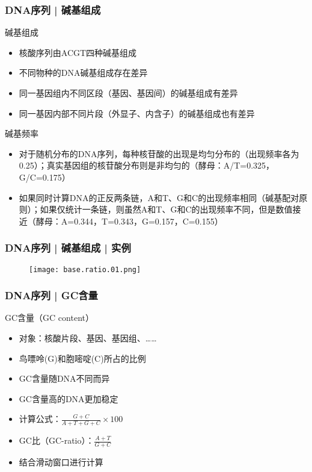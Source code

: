 \begin{frame}
  \frametitle{DNA序列 | 碱基组成}
  \begin{block}{碱基组成}
  \begin{itemize}
    \item 核酸序列由ACGT四种碱基组成
    \item 不同物种的DNA碱基组成存在差异
    \item 同一基因组内不同区段（基因、基因间）的碱基组成有差异
    \item 同一基因内部不同片段（外显子、内含子）的碱基组成也有差异
  \end{itemize}
  \end{block}
  \vspace{-0.3em}
  \pause
  \begin{block}{碱基频率}
  \begin{itemize}
    \item 对于随机分布的DNA序列，每种核苷酸的出现是均匀分布的（出现频率各为0.25）；真实基因组的核苷酸分布则是非均匀的（酵母：A/T=0.325，G/C=0.175）
    \item 如果同时计算DNA的正反两条链，A和T、G和C的出现频率相同（碱基配对原则）；如果仅统计一条链，则虽然A和T、G和C的出现频率不同，但是数值接近（酵母：A=0.344，T=0.343，G=0.157，C=0.155）
  \end{itemize}
  \end{block}
\end{frame}

\begin{frame}
  \frametitle{DNA序列 | 碱基组成 | 实例}
  \begin{figure}
    \centering
    \texttt{[image: base.ratio.01.png]}
  \end{figure}
\end{frame}

\begin{frame}
  \frametitle{DNA序列 | GC含量}
  \begin{block}{GC含量（GC content）}
    \begin{itemize}
      \item 对象：核酸片段、基因、基因组、……
      \item 鸟嘌呤(G)和胞嘧啶(C)所占的比例
      \item GC含量随DNA不同而异
      \item GC含量高的DNA更加稳定
      \item 计算公式：$\frac{G+C}{A+T+G+C}\times100$
      \item GC比（GC-ratio）：$\frac{A+T}{G+C}$
      \item 结合滑动窗口进行计算
    \end{itemize}
  \end{block}
\end{frame}

